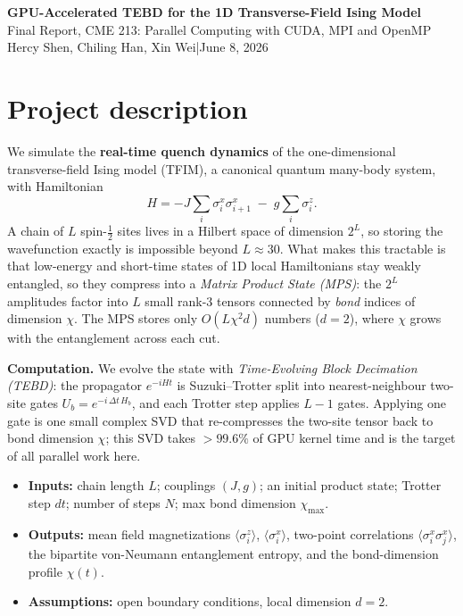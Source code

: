 \documentclass[11pt]{article}
\begin{document}
\begin{center}
{\Large\bfseries GPU-Accelerated TEBD for the 1D Transverse-Field Ising Model}\\[4pt]
{\large Final Report, CME 213: Parallel Computing with CUDA, MPI and OpenMP}\\[3pt]
{\normalsize Hercy Shen, Chiling Han, Xin Wei\quad|\quad June 8, 2026}
\end{center}



\section{Project description}

We simulate the \textbf{real-time quench dynamics} of the one-dimensional transverse-field Ising model (TFIM), a canonical quantum many-body system, with Hamiltonian
\begin{equation}
  H = -J\sum_i \sigma^x_i\sigma^x_{i+1} \;-\; g\sum_i \sigma^z_i .
\end{equation}
A chain of $L$ spin-$\tfrac{1}{2}$ sites lives in a Hilbert space of dimension $2^L$, so storing the wavefunction exactly is impossible beyond $L\approx30$. What makes this tractable is that low-energy and short-time states of 1D local Hamiltonians stay weakly entangled, so they compress into a \textit{Matrix Product State (MPS)}: the $2^L$ amplitudes factor into $L$ small rank-3 tensors connected by \emph{bond} indices of dimension $\chi$. The MPS stores only $O(L\chi^2 d)$ numbers ($d=2$), where $\chi$ grows with the entanglement across each cut.


\textbf{Computation.} We evolve the state with \textit{Time-Evolving Block Decimation
(TEBD)}: the propagator $e^{-iHt}$ is Suzuki--Trotter split into nearest-neighbour two-site gates $U_b=e^{-i\,\Delta t\,H_b}$, and each Trotter step applies $L-1$ gates. Applying one gate is one small complex SVD that re-compresses the two-site tensor back to bond dimension $\chi$; this SVD takes $>99.6\%$ of GPU kernel time and is the target of all parallel work here.

\begin{itemize}
\item \textbf{Inputs:} chain length $L$; couplings $(J,g)$; an initial product state;   Trotter step $dt$; number of steps $N$; max bond dimension $\chi_{\max}$.
\item \textbf{Outputs:} mean field magnetizations $\langle\sigma^z_i\rangle$,  $\langle\sigma^x_i\rangle$, two-point correlations $\langle\sigma^x_i\sigma^x_j\rangle$, the bipartite von-Neumann entanglement entropy, and the bond-dimension profile $\chi(t)$.
\item \textbf{Assumptions:} open boundary conditions, local dimension $d=2$.
\end{itemize}
\end{document}
